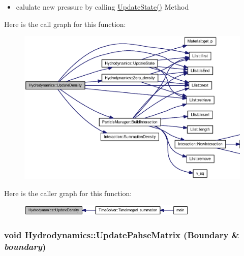 \begin{itemize}
\item calulate new pressure by calling \hyperlink{classHydrodynamics_1698dbe8ecc0e730319de5d7eca7a891}{UpdateState()} Method \end{itemize}


Here is the call graph for this function:\nopagebreak
\begin{figure}[H]
\begin{center}
\leavevmode
\includegraphics[width=352pt]{classHydrodynamics_1818eb1f9044ae980e92c70146e51c5b_cgraph}
\end{center}
\end{figure}


Here is the caller graph for this function:\nopagebreak
\begin{figure}[H]
\begin{center}
\leavevmode
\includegraphics[width=242pt]{classHydrodynamics_1818eb1f9044ae980e92c70146e51c5b_icgraph}
\end{center}
\end{figure}
\hypertarget{classHydrodynamics_a755853b07cbbc5b484d78a3e787d1ef}{
\subsubsection[{UpdatePahseMatrix}]{\setlength{\rightskip}{0pt plus 5cm}void Hydrodynamics::UpdatePahseMatrix ({\bf Boundary} \& {\em boundary})}}
\label{classHydrodynamics_a755853b07cbbc5b484d78a3e787d1ef}


